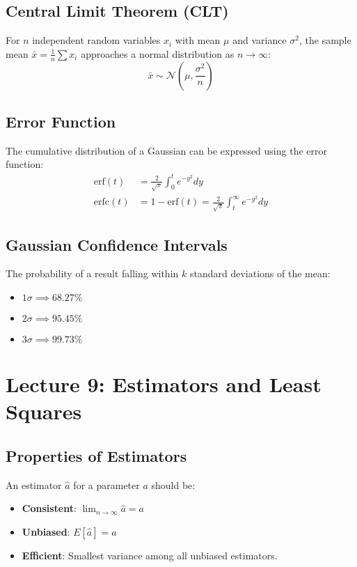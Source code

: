\documentclass[10pt, twocolumn]{article}
\begin{document}
\subsection{Central Limit Theorem (CLT)}
For $n$ independent random variables $x_i$ with mean $\mu$ and variance $\sigma^2$, the sample mean $\bar{x} = \frac{1}{n} \sum x_i$ approaches a normal distribution as $n \to \infty$:
\[ \bar{x} \sim \mathcal{N}\left(\mu, \frac{\sigma^2}{n}\right) \]

\subsection{Error Function}
The cumulative distribution of a Gaussian can be expressed using the error function:
\begin{align}
    \text{erf}(t)  & = \frac{2}{\sqrt{\pi}} \int_0^t e^{-y^2} dy                          \\
    \text{erfc}(t) & = 1 - \text{erf}(t) = \frac{2}{\sqrt{\pi}} \int_t^\infty e^{-y^2} dy
\end{align}

\subsection{Gaussian Confidence Intervals}
The probability of a result falling within $k$ standard deviations of the mean:
\begin{itemize}
    \item $1\sigma \implies 68.27\%$
    \item $2\sigma \implies 95.45\%$
    \item $3\sigma \implies 99.73\%$
\end{itemize}

\section{Lecture 9: Estimators and Least Squares}

\subsection{Properties of Estimators}
An estimator $\hat{a}$ for a parameter $a$ should be:
\begin{itemize}
    \item \textbf{Consistent}: $\lim_{n \to \infty} \hat{a} = a$
    \item \textbf{Unbiased}: $E[\hat{a}] = a$
    \item \textbf{Efficient}: Smallest variance among all unbiased estimators.
\end{itemize}
\end{document}
